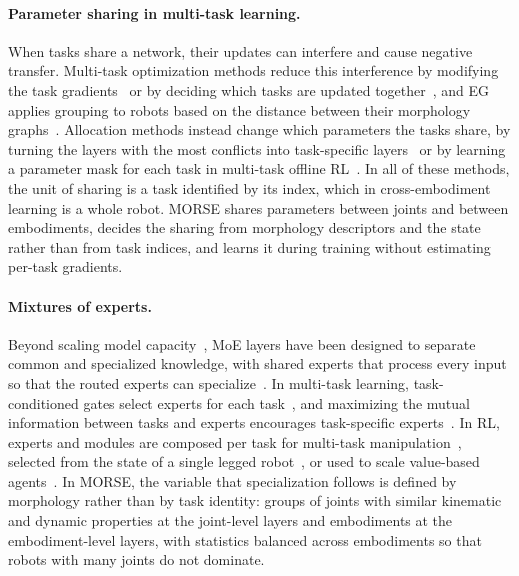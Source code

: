 \paragraph{Parameter sharing in multi-task learning.}
When tasks share a network, their updates can interfere and cause negative transfer. Multi-task optimization methods
reduce this interference by modifying the task gradients~\citep{yu2020pcgrad,liu2021cagrad,navon2022nashmtl,liu2023famo}
or by deciding which tasks are updated together~\citep{standley2020which,fifty2021tag,jeong2025sel}, and EG applies
grouping to robots based on the distance between their morphology graphs~\citep{abe2026crossembodimentoffline}.
Allocation methods instead change which parameters the tasks share, by turning the layers with the most conflicts into
task-specific layers~\citep{shi2023recon} or by learning a parameter mask for each task in multi-task offline
RL~\citep{hu2024harmodt}. In all of these methods, the unit of sharing is a task identified by its index, which in
cross-embodiment learning is a whole robot. MORSE shares parameters between joints and between embodiments, decides
the sharing from morphology descriptors and the state rather than from task indices, and learns it during training
without estimating per-task gradients.

\paragraph{Mixtures of experts.}
Beyond scaling model capacity~\citep{shazeer2017outrageously,lepikhin2021gshard,fedus2022switch,riquelme2021vmoe},
MoE layers have been designed to separate common and specialized knowledge, with shared experts that process every
input so that the routed experts can specialize~\citep{dai2024deepseekmoe}. In multi-task learning, task-conditioned
gates select experts for each task~\citep{ma2018mmoe,liang2022m3vit}, and maximizing the mutual information between
tasks and experts encourages task-specific experts~\citep{chen2023modsquad}. In RL, experts and modules are composed
per task for multi-task manipulation~\citep{yang2020softmodularization,sodhani2021care,sun2022paco,hendawy2024moore},
selected from the state of a single legged robot~\citep{huang2025moeloco}, or used to scale value-based
agents~\citep{obandoceron2024moerl}. In MORSE, the variable that specialization follows is defined by morphology rather
than by task identity: groups of joints with similar kinematic and dynamic properties at the joint-level layers and
embodiments at the embodiment-level layers, with statistics balanced across embodiments so that robots with many
joints do not dominate.

